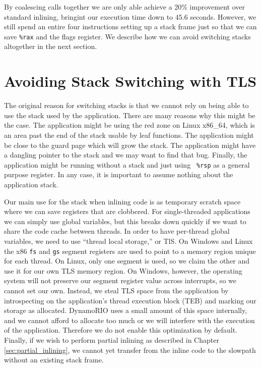 By coalescing calls together we are only able achieve a 20\% improvement over
standard inlining, bringint our execution time down to 45.6 seconds.  However,
we still spend an entire four instructions setting up a stack frame just so
that we can save {\tt \%rax} and the flags register.  We describe how we can
avoid switching stacks altogether in the next section.

\section{Avoiding Stack Switching with TLS}
\label{sec:tls_scratch}

The original reason for switching stacks is that we cannot rely on being able to
use the stack used by the application.  There are many reasons why this might be
the case.  The application might be using the red zone on Linux x86\_64, which
is an area past the end of the stack usable by leaf functions.  The application
might be close to the guard page which will grow the stack.  The application
might have a dangling pointer to the stack and we may want to find that bug.
Finally, the application might be running without a stack and just using {\tt
\%rsp} as a general purpose register.  In any case, it is important to assume
nothing about the application stack.

Our main use for the stack when inlining code is as temporary scratch space
where we can save registers that are clobbered.  For single-threaded
applications we can simply use global variables, but this breaks down quickly if
we want to share the code cache between threads.  In order to have per-thread
global variables, we need to use ``thread local storage,'' or TlS.  On Windows
and Linux the x86 {\tt fs} and {\tt gs} segment registers are used to point to a
memory region unique for each thread.  On Linux, only one segment is used, so we
claim the other and use it for our own TLS memory region.  On Windows, however,
the operating system will not preserve our segment register value across
interrupts, so we cannot set our own.  Instead, we steal TLS space from the
application by introspecting on the application's thread execution block (TEB)
and marking our storage as allocated.\cite{inside_win2k}  DynamoRIO uses a small
amount of this space internally, and we cannot afford to allocate too much or we
will interfere with the execution of the application.  Therefore we do not
enable this optimization by default.  Finally, if we wish to perform partial
inlining as described in Chapter \ref{sec:partial_inlining}, we cannot yet
transfer from the inline code to the slowpath without an existing stack frame.

